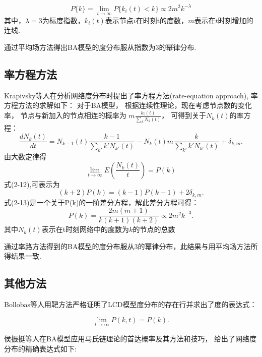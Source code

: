 \documentclass[bachelor,adobefonts]{jnuthesis}
\begin{document}
\begin{equation}
  P\{k\} = \lim_{t \rightarrow \infty} P\{k_i(t)<k\} \propto 2m^2k^{-\lambda}
\end{equation}
其中，$\lambda =3$为标度指数，$k_i(t)$表示节点$i$在时刻t的度数，$m$表示在$t$时刻增加的连线.

通过平均场方法得出BA模型的度分布服从指数为3的幂律分布.

\subsection{率方程方法}
Krapivsky等人在分析网络度分布时提出了率方程方法(rate-equation approach),
率方程方法的求解如下：
对于BA模型，
根据连续性理论，现在考虑节点数的变化率，
节点与新加入的节点相连的概率为
$m \frac{k_i(t)}{\sum_{k}^{}N_k(t)}$，
可得到关于$N_k(t)$的率方程：
\begin{equation}
 \frac{dN_k(t)}{dt} = N_{k-1}(t)\frac{k-1}{\sum_{k'}^{}k'N_{k'}(t)} - N_k(t)m
 \frac{k}{\sum_{k'}^{}k'N_{k'}(t)} + \delta_{k,m}.
\end{equation}
由大数定律得
$$\lim_{t \rightarrow \infty}E\left( \frac{N_k(t)}{t}\right) = P(k)$$
式(2-12),可表示为
\begin{equation}
  (k+2)P(k) = (k-1)P(k-1) + 2\delta_{k,m}.
 \end{equation}
 式(2-13)是一个关于P(k)的一阶差分方程，解此差分方程可得：
 \begin{equation}
  P(k) = \frac{2m(m+1)}{k(k+1)(k+2)} \propto 2m^2k^{-3}.
 \end{equation}
其中$N_k(t)$表示在t时刻网络中的度数为$k$的节点的总数

 通过率路方法得到的BA模型的度分布服从3的幂律分布，此结果与用平均场方法所得结果一致.

\subsection{其他方法}
Bollobas等人用靶方法严格证明了LCD模型度分布的存在行并求出了度的表达式：

\begin{equation}
  \lim_{t \rightarrow \infty}P(k,t) = P(k).
\end{equation}

侯振挺等人在BA模型应用马氏链理论的首达概率及其方法和技巧，
给出了网络度分布的精确表达式如下:
\end{document}
